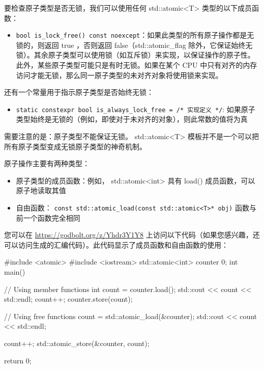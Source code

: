 要检查原子类型是否无锁，我们可以使用任何 std::atomic<T> 类型的以下成员函数：

\begin{itemize}
\item
\verb|bool is_lock_free() const noexcept|：如果此类型的所有原子操作都是无锁的，则返回 true ，否则返回 false（std::atomic\_flag 除外，它保证始终无锁）。其余原子类型可以使用锁（如互斥锁）来实现，以保证操作的原子性。此外，某些原子类型可能只是有时无锁。如果在某个 CPU 中只有对齐的内存访问才能无锁，那么同一原子类型的未对齐对象将使用锁来实现。
\end{itemize}

还有一个常量用于指示原子类型是否始终无锁：

\begin{itemize}
\item
\verb|static constexpr bool is_always_lock_free = /* 实现定义 */|: 如果原子类型始终是无锁的（例如，即使对于未对齐的对象），则此常数的值将为真
\end{itemize}

需要注意的是：原子类型不能保证无锁。 std::atomic<T> 模板并不是一个可以把所有原子类型变成无锁原子类型的神奇机制。


原子操作主要有两种类型：

\begin{itemize}
\item
原子类型的成员函数：例如， std::atomic<int> 具有 load() 成员函数，可以原子地读取其值

\item
自由函数： \verb|const std::atomic_load(const std::atomic<T>* obj)| 函数与前一个函数完全相同
\end{itemize}

您可以在 \url{https://godbolt.org/z/Yhdr3Y1Y8} 上访问以下代码（如果您感兴趣，还可以访问生成的汇编代码）。此代码显示了成员函数和自由函数的使用：

\begin{cpp}
#include <atomic>
#include <iostream>
std::atomic<int> counter {0};
int main() {
    // Using member functions
    int count = counter.load();
    std::cout << count << std::endl;
    count++;
    counter.store(count);

    // Using free functions
    count = std::atomic_load(&counter);
    std::cout << count << std::endl;

    count++;
    std::atomic_store(&counter, count);

    return 0;
}
\end{cpp}

